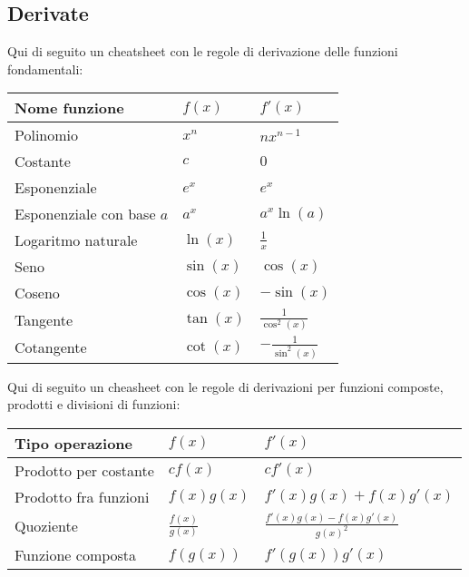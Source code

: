 \subsection{Derivate}
\renewcommand{\arraystretch}{1.4}
Qui di seguito un cheatsheet con le regole di derivazione delle funzioni fondamentali:
\begin{center}
	\begin{tabular}{l l l}
		\hline
		Nome funzione               & $ f\left(x\right) $ & $f'(x)$                     \\
		\hline
		Polinomio                   & $  x^{n} $          & $  n  x^{n-1} $             \\
		Costante                    & $  c $              & $  0 $                      \\
		Esponenziale                & $  e^{x} $          & $  e^{x} $                  \\
		Esponenziale con base $ a $ & $  a^{x} $          & $  a^{x} \ln(a) $           \\
		Logaritmo naturale          & $  \ln(x) $         & $  \frac{1}{x} $            \\
		Seno                        & $  \sin(x) $        & $  \cos(x) $                \\
		Coseno                      & $  \cos(x) $        & $  -\sin(x) $               \\
		Tangente                    & $  \tan(x) $        & $  \frac{1}{\cos^{2}(x)} $  \\
		Cotangente                  & $  \cot(x) $        & $  -\frac{1}{\sin^{2}(x)} $ \\
		\hline
	\end{tabular}
\end{center}
\renewcommand{\arraystretch}{1}
Qui di seguito un cheasheet con le regole di derivazioni per funzioni composte, prodotti e divisioni di funzioni:
\renewcommand{\arraystretch}{1.4}
\begin{center}
	\begin{tabular}{l l l}
		\hline
		Tipo operazione       & $ f\left(x\right) $    & $f '(x)$                                  \\
		\hline
		Prodotto per costante & $  cf(x) $             & $ cf'(x) $                                \\
		Prodotto fra funzioni & $  f(x)g(x) $          & $  f'(x)g(x) + f(x)g'(x) $                \\
		Quoziente             & $  \frac{f(x)}{g(x)} $ & $  \frac{f'(x)g(x) - f(x)g'(x)}{g(x)^2} $ \\
		Funzione composta     & $  f(g(x)) $           & $  f'(g(x))g'(x) $                        \\
		\hline
	\end{tabular}
\end{center}

